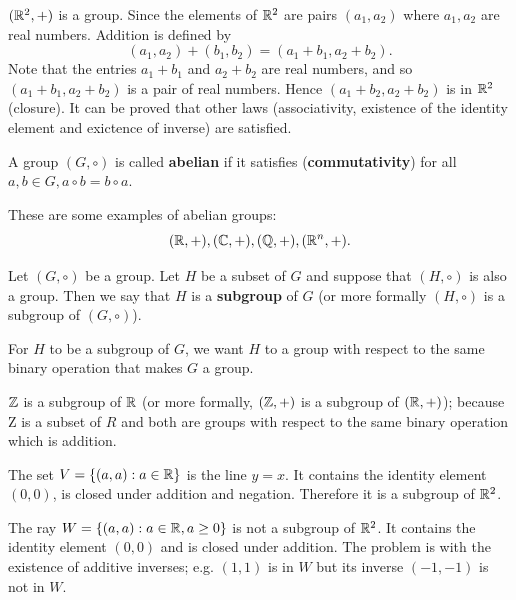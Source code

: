 \documentclass[12pt]{book}
\begin{document}
\begin{examp}\label{exp:group2}
      $(\mathbb{R}^2,+)$ is a group. Since the  elements of $\mathbb{R}^2$ are pairs $(a_1,a_2)$ where $a_1, a_2$ are real numbers. Addition is defined
      by 
      $$(a_1,a_2)+(b_1,b_2) = (a_1+b_1,a_2+b_2).$$
      Note that the entries $a_1 + b_1$ and $a_2 + b_2$ are real numbers, and so $(a_1 + b_1,a_2 +b_2)$ is a pair of real numbers. Hence 
	  $(a_1 + b_2,a_2 + b_2)$ is in $\mathbb{R}^2$ (closure). It can be proved that other laws (associativity, existence of the identity element 
	  and exictence of inverse) are satisfied.
\end{examp}

\begin{defi}\label{def:group2}
      A group $(G,\circ)$ is called \textbf{abelian} if it satisfies (\textbf{commutativity}) for all $a, b \in G, a \circ b = b \circ a$.
\end{defi}

\begin{examp}\label{exp:group3}
      These are some examples of abelian groups: 
	  $$(\mathbb{R},+), (\mathbb{C},+), (\mathbb{Q},+), (\mathbb{R}^n,+).$$
\end{examp}
\begin{defi}\label{def:group3}
      Let $(G,\circ)$ be a group. Let $H$ be a subset of $G$ and suppose that $(H,\circ)$ is also a group. Then we say that $H$ is a 
	  \textbf{subgroup} of $G$ (or more formally $(H,\circ)$ is a subgroup of $(G,\circ)$). 
\end{defi}	  
For $H$ to be a subgroup of $G$, we want $H$ to a group with respect to the same binary operation that makes $G$ a group.

\begin{examp}\label{exp:group4}
      $\mathbb{Z}$ is a subgroup of $\mathbb{R}$ (or more formally, $(\mathbb{Z},+)$ is a subgroup of $(\mathbb{R},+)$); because Z is a subset of $R$ and both are
	  groups with respect to the same binary operation which is addition.
\end{examp}

\begin{examp}\label{exp:group5}
      The set $V = \{(a,a) : a \in \mathbb{R} \}$ is the line $y = x$. It contains the identity element $(0, 0)$, is closed under addition
      and negation. Therefore it is a subgroup of $\mathbb{R}^2$.
\end{examp}

\begin{examp}\label{exp:group6}
      The ray $W = \{(a,a) : a \in \mathbb{R}, a \geq 0 \}$ is not a subgroup of $\mathbb{R}^2$. It contains the identity element $(0,0)$ and
      is closed under addition. The problem is with the existence of additive inverses; e.g. $(1,1)$ is in $W$ but its inverse
      $(-1,-1)$ is not in $W$.
\end{examp}
\end{document}
